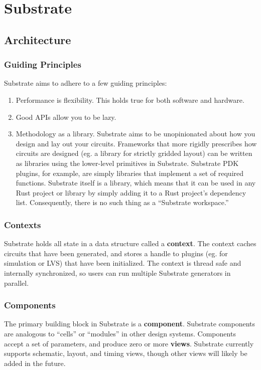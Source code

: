 \chapter{Substrate} \label{sec:substrate}

\section{Architecture}
\subsection{Guiding Principles}

Substrate aims to adhere to a few guiding principles:
\begin{enumerate}
\item Performance is flexibility. This holds true for both software and hardware.
\item Good APIs allow you to be lazy.
\item Methodology as a library. Substrate aims to be unopinionated about how you design and lay out your circuits.
  Frameworks that more rigidly prescribes how circuits are designed (eg. a library for strictly gridded layout)
  can be written as libraries using the lower-level primitives in Substrate.
  Substrate PDK plugins, for example, are simply libraries that implement a set of required functions.
  Substrate itself is a library, which means that it can be used in any Rust project or library by simply adding it to a Rust project's dependency list. Consequently, there is no such thing as a ``Substrate workspace.''
\end{enumerate}

\subsection{Contexts}

Substrate holds all state in a data structure called a \textbf{context}.
The context caches circuits that have been generated, and stores a handle to plugins (eg. for simulation or LVS) that have been initialized.
The context is thread safe and internally synchronized, so users can run multiple Substrate generators in parallel.

\subsection{Components}

The primary building block in Substrate is a \textbf{component}.
Substrate components are analogous to ``cells'' or ``modules'' in other design systems.
Components accept a set of parameters, and produce zero or more \textbf{views}.
Substrate currently supports schematic, layout, and timing views,
though other views will likely be added in the future.

